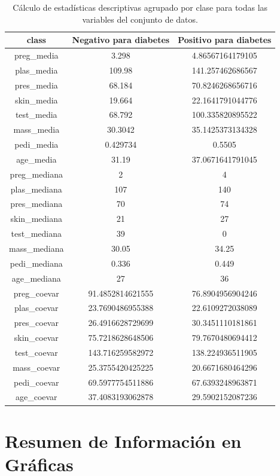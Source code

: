 \documentclass[11pt,letterpaper]{article}
\begin{document}
\begin{table}[t]
\centering
\begin{tabular}{|c|c|c|} \hline
{\sc class} & {\sc Negativo para diabetes} & {\sc Positivo para diabetes}\\ \hline
preg\_media & 3.298 & 4.86567164179105\\ 
plas\_media & 109.98 & 141.257462686567\\ 
pres\_media & 68.184 & 70.8246268656716\\ 
skin\_media & 19.664 & 22.1641791044776\\ 
test\_media & 68.792 & 100.335820895522\\ 
mass\_media & 30.3042 & 35.1425373134328\\ 
pedi\_media & 0.429734 & 0.5505\\ 
age\_media & 31.19 & 37.0671641791045\\ \hline
preg\_mediana & 2 & 4\\ 
plas\_mediana & 107 & 140\\ 
pres\_mediana & 70 & 74\\ 
skin\_mediana & 21 & 27\\ 
test\_mediana & 39 & 0\\ 
mass\_mediana & 30.05 & 34.25\\ 
pedi\_mediana & 0.336 & 0.449\\ 
age\_mediana & 27 & 36\\  \hline
preg\_coevar & 91.4852814621555 & 76.8904956904246\\ 
plas\_coevar & 23.7690486955388 & 22.6109272038089\\ 
pres\_coevar & 26.4916628729699 & 30.3451110181861\\ 
skin\_coevar & 75.7218628648506 & 79.7670480694412\\ 
test\_coevar & 143.716259582972 & 138.224936511905\\ 
mass\_coevar & 25.3755420425225 & 20.6671680464296\\ 
pedi\_coevar & 69.5977754511886 & 67.6393248963871\\ 
age\_coevar & 37.4083193062878 & 29.5902152087236\\  \hline
\end{tabular}
\caption{Cálculo de estadísticas descriptivas agrupado por clase para todas las variables del conjunto de datos.}
\label{tab:table-01}
\end{table}

\section{Resumen de Información en Gráficas}
\end{document}
